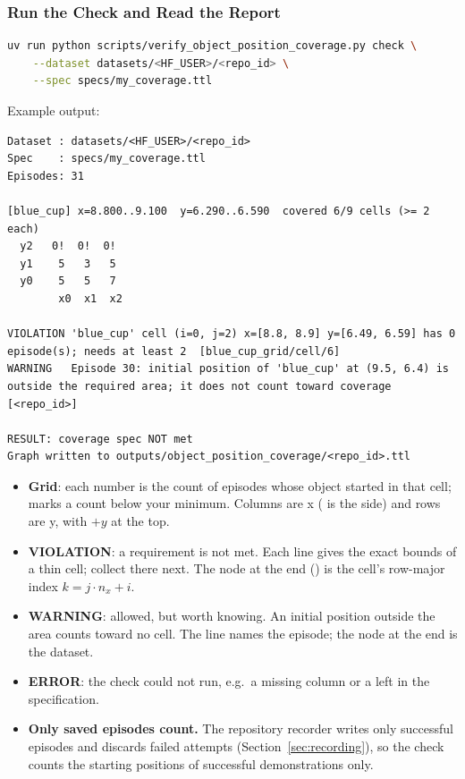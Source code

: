\documentclass[11pt]{article}
\DeclareRobustCommand{\code}{\codeurl}  %
\begin{document}
\subsubsection{Run the Check and Read the Report}

\begin{lstlisting}[language=bash]
uv run python scripts/verify_object_position_coverage.py check \
    --dataset datasets/<HF_USER>/<repo_id> \
    --spec specs/my_coverage.ttl
\end{lstlisting}

Example output:

\begin{lstlisting}
Dataset : datasets/<HF_USER>/<repo_id>
Spec    : specs/my_coverage.ttl
Episodes: 31

[blue_cup] x=8.800..9.100  y=6.290..6.590  covered 6/9 cells (>= 2 each)
  y2   0!  0!  0!
  y1    5   3   5
  y0    5   5   7
        x0  x1  x2

VIOLATION 'blue_cup' cell (i=0, j=2) x=[8.8, 8.9] y=[6.49, 6.59] has 0 episode(s); needs at least 2  [blue_cup_grid/cell/6]
WARNING   Episode 30: initial position of 'blue_cup' at (9.5, 6.4) is outside the required area; it does not count toward coverage  [<repo_id>]

RESULT: coverage spec NOT met
Graph written to outputs/object_position_coverage/<repo_id>.ttl
\end{lstlisting}

\begin{itemize}
  \item \textbf{Grid}: each number is the count of episodes whose object started in that cell; \code{!} marks a count below
        your minimum. Columns are x (\code{x0} is the \code{areaXMin} side) and rows are y, with $+y$ at the top.
  \item \textbf{VIOLATION}: a requirement is not met. Each line gives the exact bounds of a thin cell; collect there next.
        The node at the end (\code{blue_cup_grid/cell/6}) is the cell's row-major index $k = j \cdot n_x + i$.
  \item \textbf{WARNING}: allowed, but worth knowing. An initial position outside the area counts toward no cell. The line names the episode; the node at the end is the dataset.
  \item \textbf{ERROR}: the check could not run, e.g.\ a missing column or a \code{TODO} left in the specification.
  \item \textbf{Only saved episodes count.} The repository recorder writes only successful episodes and discards failed attempts (Section~\ref{sec:recording}), so the check counts the starting positions of successful demonstrations only.
\end{itemize}
\end{document}
